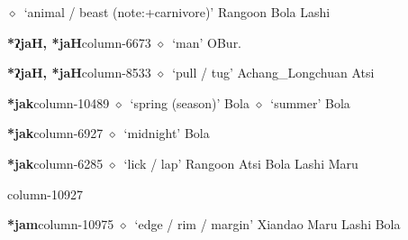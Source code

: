          $\diamond$~`animal / beast (note:+carnivore)'
         Rangoon 
\hspace{1ex}
         Bola 
\hspace{1ex}
         Lashi 
  \item {\footnotesize \textbf{*ʔjaH, *jaH}}{\tiny column-6673}
         $\diamond$~`man'
         OBur. 
  \item {\footnotesize \textbf{*ʔjaH, *jaH}}{\tiny column-8533}
         $\diamond$~`pull / tug'
         Achang\_Longchuan 
\hspace{1ex}
         Atsi 
  \item {\footnotesize \textbf{*jak}}{\tiny column-10489}
         $\diamond$~`spring (season)'
         Bola 
\hspace{1ex}
         $\diamond$~`summer'
         Bola 
  \item {\footnotesize \textbf{*jak}}{\tiny column-6927}
         $\diamond$~`midnight'
         Bola 
  \item {\footnotesize \textbf{*jak}}{\tiny column-6285}
         $\diamond$~`lick / lap'
         Rangoon 
\hspace{1ex}
         Atsi 
\hspace{1ex}
         Bola 
\hspace{1ex}
         Lashi 
\hspace{1ex}
         Maru 
  \item {\footnotesize \textbf{}}{\tiny column-10927}
  \item {\footnotesize \textbf{*jam}}{\tiny column-10975}
         $\diamond$~`edge / rim / margin'
         Xiandao 
\hspace{1ex}
         Maru 
\hspace{1ex}
         Lashi 
\hspace{1ex}
         Bola 
\hspace{1ex}
